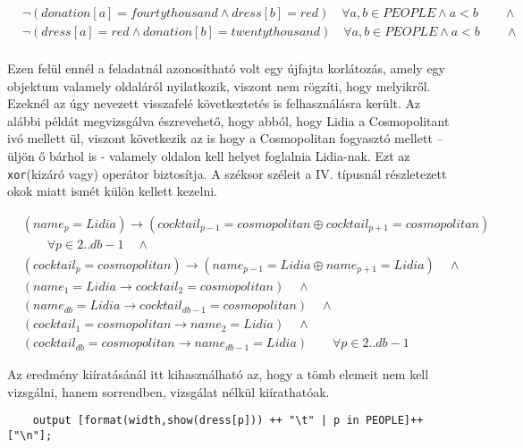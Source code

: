 \documentclass[12pt,a4paper,twoside, openright]{report}
\begin{document}
    \begin{equation} \label{eq:16}
    \begin{aligned}
    	&\neg(donation[a]=fourtythousand \wedge dress[b]=red) \quad \forall a,b \in PEOPLE \wedge a<b \qquad \wedge \\
    	&\neg(dress[a]=red \wedge donation[b]=twentythousand) \quad \forall a,b \in PEOPLE \wedge a<b \qquad \wedge \\
    \end{aligned}
    \end{equation}

    Ezen felül ennél a feladatnál azonosítható volt egy újfajta korlátozás, amely egy objektum valamely oldaláról nyilatkozik, viszont nem rögzíti, hogy melyikről.
    Ezeknél az úgy nevezett visszafelé következtetés is felhasználásra került.
    Az alábbi példát megvizsgálva észrevehető, hogy abból, hogy Lidia a Cosmopolitant ivó mellett ül, viszont következik az is hogy a Cosmopolitan fogyasztó mellett – üljön ő bárhol is - valamely oldalon kell helyet foglalnia Lidia-nak.
    Ezt az \texttt{xor}(kizáró vagy) operátor biztosítja.
    A széksor széleit a IV. típusnál részletezett okok miatt ismét külön kellett kezelni.

    \begin{equation}
    \begin{aligned}
     &(name_p=Lidia) \rightarrow (cocktail_{p-1}=cosmopolitan \oplus cocktail_{p+1}=cosmopolitan) \\ 
     &\quad \quad \forall  p \in 2..db-1 \quad \wedge \\
   	 &(cocktail_p=cosmopolitan) \rightarrow (name_{p-1}=Lidia \oplus name_{p+1}=Lidia) \quad  \wedge \\
     &(name_1=Lidia \rightarrow cocktail_2=cosmopolitan) \quad \wedge \\
     &(name_{db}=Lidia \rightarrow cocktail_{db-1}=cosmopolitan) \quad \wedge \\
     &(cocktail_1= cosmopolitan \rightarrow name_2=Lidia) \quad \wedge \\
     &(cocktail_{db}=cosmopolitan \rightarrow name_{db-1}=Lidia) \quad \quad \forall p \in 2..db-1
     \end{aligned}
    \end{equation} 
    
    Az eredmény kiíratásánál itt kihasználható az, hogy a tömb elemeit nem kell vizsgálni, hanem sorrendben, vizsgálat nélkül kiírathatóak.
	
	\begin{lstlisting}
	output [format(width,show(dress[p])) ++ "\t" | p in PEOPLE]++["\n"];\end{lstlisting}
\end{document}
